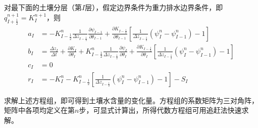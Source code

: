 对最下面的土壤分层（第$I$层），假定边界条件为重力排水边界条件，即$q_{I+\frac{1}{2}}^{n+1}=K_{I}^{n+1}$，则
\begin{equation}
\begin{aligned}
a_I &= - K_{I-\frac{1}{2}}^{n} \frac{1}{\Delta z_{I-\frac{1}{2}}}
     \frac{\partial \psi_{I-1}}{\partial \theta_{I-1}}+\frac{\partial K_{I-\frac{1}{2}}}
     {\partial \theta_{I-1}}\left[\frac{1}{\Delta z_{I-\frac{1}{2}}}\left(\psi_{I}^{n}-\psi_{I-1}^{n}\right)-1\right] \\
b_I &= \frac{\Delta z_{I}}{\Delta t}+\frac{\partial K_{I}}
    {\partial \theta_{I}}+K_{I-\frac{1}{2}}^{n} \frac{1}{\Delta z_{I-\frac{1}{2}}} \frac{\partial \psi_{I}}{\partial \theta_{I}}+
    \frac{\partial K_{I-\frac{1}{2}}}{\partial \theta_{I}}\left[\frac{1}{\Delta z_{I-\frac{1}{2}}}\left(\psi_{I}^{n}-\psi_{I-1}^{n}\right)-1\right] \\
c_I &= 0 \\
r_I &= -K_{I}^{n}-K_{I-\frac{1}{2}}^{n}\left[\frac{1}{\Delta z_{I-\frac{1}{2}}}\left(\psi_{I}^{n}-\psi_{I-1}^{n}\right)-1\right]-S_{I}
\end{aligned}
\end{equation}

求解上述方程组，即可得到土壤水含量的变化量。方程组的系数矩阵为三对角阵，矩阵中各项均定义在第$n$步，可显式计算出，所得代数方程组可用追赶法快速求解。

